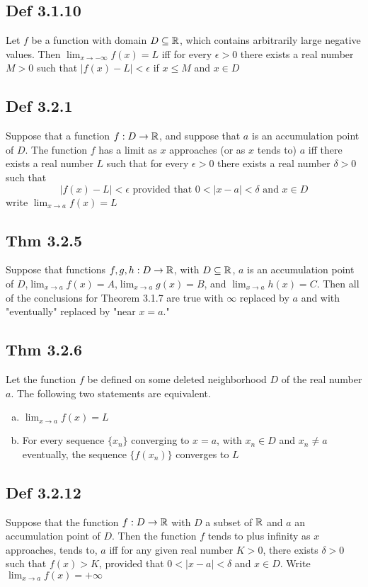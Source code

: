 \subsection*{Def 3.1.10}
    Let $f$ be a function with domain $D \subseteq \mathbb{R}$, which contains arbitrarily large negative values. Then $\lim_{x \to -\infty} f (x) = L$ iff for every $\epsilon > 0$ there exists a real number $M > 0$ such that $|f (x) - L| < \epsilon$ if $x \le M$ and $x \in D$

\subsection*{Def 3.2.1}
    Suppose that a function $f : D \to \mathbb{R}$, and suppose that $a$ is an accumulation point of $D$. The function $f$ has a limit as $x$ approaches (or as $x$ tends to) $a$ iff there exists a real number $L$ such that for every $\epsilon > 0$ there exists a real number $\delta > 0$ such that
    \[
    |f(x) - L| < \epsilon \text{ provided that } 0 < |x - a| < \delta \text{ and } x \in D
    \] 
    write $\lim_{x \to a} f(x) = L$

\subsection*{Thm 3.2.5}
    Suppose that functions $f, g, h : D \to \mathbb{R}$, with $D \subseteq \mathbb{R}$, $a$ is an accumulation point of $D$,$\lim_{x \to a} f(x) = A$,$\lim_{x \to a} g (x) = B$, and $\lim_{x \to a} h (x) = C$. Then all of the conclusions for Theorem 3.1.7 are true with $\infty$ replaced by $a$ and with "eventually" replaced by "near $x = a$."

\subsection*{Thm 3.2.6}
    Let the function $f$ be defined on some deleted neighborhood $D$ of the real number $a$. The following two statements are equivalent.
    \begin{enumerate}[(a)]
        \item $\lim_{x \to a} f(x) = L$ 
	\item For every sequence $ \{ x_n \} $ converging to $x = a$, with $x_n \in D$ and $x_n \not= a$ eventually, the sequence $\{ f(x_n) \} $ converges to $L$
    \end{enumerate}

\subsection*{Def 3.2.12}
    Suppose that the function $f : D \to \mathbb{R} $ with $D$ a subset of $\mathbb{R}$ and $a$ an accumulation point of $D$. Then the function $f$ tends to plus infinity as $x$ approaches, tends to, $a$ iff for any given real number $K > 0$, there exists $\delta > 0$ such that $f (x) > K$, provided that $0 < |x - a| < \delta$ and $x \in D$. Write $\lim_{x \to a} f (x) = +\infty$
